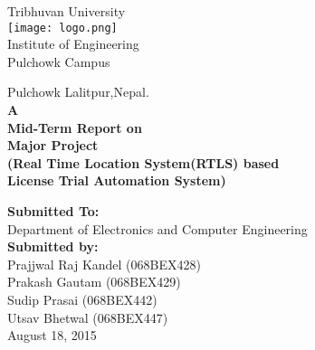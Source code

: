 \begin{titlepage}
	\begin{center}
		\begin{Huge}
			Tribhuvan University\\
			\texttt{[image: logo.png]}\\
			Institute of Engineering\\
			 Pulchowk Campus\\
		\end{Huge}
			Pulchowk Lalitpur,Nepal.\\
			\vfill
		\textbf{
					A\\
					Mid-Term Report on\\
					Major Project\\
					(Real Time Location System(RTLS) based\\
					License Trial Automation System)\\
				}
		\vfill

		\textbf{Submitted To:\\}
			Department of Electronics and Computer Engineering\\[2cm]
		\textbf{Submitted by:\\}
			Prajjwal Raj Kandel (068BEX428)\\
			Prakash Gautam (068BEX429)\\
			Sudip Prasai (068BEX442)\\
			Utsav Bhetwal (068BEX447)\\
			\vfill
			August 18, 2015
	\end{center}
\end{titlepage}
